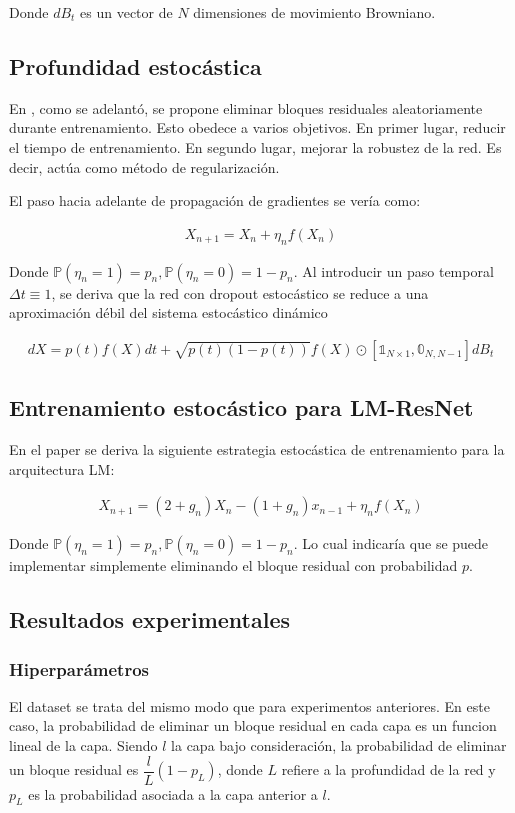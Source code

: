 \documentclass[titlepage,a4paper,oneside]{article}
\begin{document}
Donde $dB_t$ es un vector de $N$ dimensiones de movimiento Browniano.

\subsection{Profundidad estocástica}
En \cite{huang2016deep}, como se adelantó, se propone eliminar bloques residuales aleatoriamente durante entrenamiento. Esto obedece a varios objetivos. En primer lugar, reducir el tiempo de entrenamiento. En segundo lugar, mejorar la robustez de la red. Es decir, actúa como método de regularización.

El paso hacia adelante de propagación de gradientes se vería como:

\begin{align}
	X_{n+1} = X_n + \eta_n f(X_n)
\end{align}

Donde $\mathbb{P}(\eta_n = 1) = p_n, \mathbb{P}(\eta_n = 0) = 1 - p_n$. Al introducir un paso temporal $\Delta t \equiv 1$, se deriva que la red con dropout estocástico se reduce a una aproximación débil del sistema estocástico dinámico

\begin{align}
	dX = p(t) f(X) dt + \sqrt{p(t) (1-p(t))} f(X) \odot [\mathbb{1}_{N \times 1}, \mathbb{0}_{N, N - 1}] dB_t
\end{align}

\subsection{Entrenamiento estocástico para LM-ResNet}
En el paper se deriva la siguiente estrategia estocástica de entrenamiento para la arquitectura LM:

\begin{align}
	X_{n+1} = (2 + g_n) X_n - (1 + g_n) x_{n-1} + \eta_n f(X_n)
\end{align}

Donde $\mathbb{P}(\eta_n = 1) = p_n, \mathbb{P}(\eta_n = 0) = 1 - p_n$. Lo cual indicaría que se puede implementar simplemente eliminando el bloque residual con probabilidad $p$.

\subsection{Resultados experimentales}
\subsubsection{Hiperparámetros}
El dataset se trata del mismo modo que para experimentos anteriores. En este caso, la probabilidad de eliminar un bloque residual en cada capa es un funcion lineal de la capa. Siendo $l$ la capa bajo consideración, la probabilidad de eliminar un bloque residual es $\dfrac{l}{L}(1 - p_L)$, donde $L$ refiere a la profundidad de la red y $p_L$ es la probabilidad asociada a la capa anterior a $l$.
\end{document}
